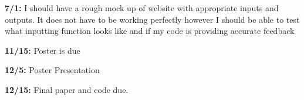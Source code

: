 \documentclass[10pt,twocolumn]{article}
\begin{document}
\textbf{7/1:} I should have a rough mock up of website with appropriate inputs and outputs. It does not have to be working perfectly however I should be able to test what inputting function looks like and if my code is providing accurate feedback


\textbf{11/15:} 
Poster is due 

\textbf{12/5:} 
Poster Presentation

\textbf{12/15:} 
Final paper and code due.


\begin{comment}
No definition citations, unless the term itself is in dispute
Separate problem background from technical background
    Unclear if games and apps require much technical background
    The general structure of the framework might be better suited for the Architecture Overview section
        Eg. Flask uses decorators to associate functions with URLs
        Eg. Unity has scripts associated with objects and specific triggers, such as walking into an area, pressing a button, etc.
    Maybe a better name is "algorithmic background"?
        Should explore what does and doesn't count
            All ML counts
            App and game frameworks do not
        Framework vs. library?
            I like the idea of [inversion of control](https://martinfowler.com/bliki/InversionOfControl.html), but that may be too abstract for students to understand
        Heuristic: is understanding that system necessary to understand the results?
            Ie. How Flask or Unity works doesn't influence whether the app/game is useful/fun/engaging
            But how (say) linear regression works is highly relevant for why the results match/don't match the actual values
\end{comment}

\printbibliography 
\end{document}
